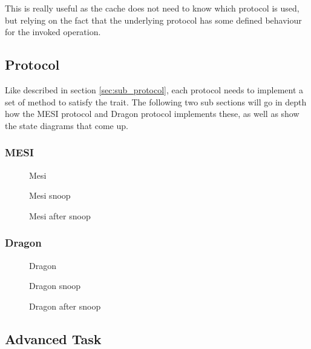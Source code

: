 This is really useful as the cache does not need to know which protocol is used, but relying on the fact that the underlying protocol has some defined behaviour for the invoked operation.


\subsection{Protocol}
Like described in section \ref{sec:sub_protocol}, each protocol needs to implement a set of method to satisfy the trait.
The following two sub sections will go in depth how the MESI protocol and Dragon protocol implements these, as well as show the state diagrams that come up.

\subsubsection{MESI}

\begin{figure}[ht]
    \centering
    \caption{Mesi}
    \label{fig:mesi}
\end{figure}

\begin{figure}[ht]
    \centering
    \caption{Mesi snoop}
    \label{fig:mesi_snoop}
\end{figure}

\begin{figure}[ht]
    \centering
    \caption{Mesi after snoop}
    \label{fig:mesi_after_snoop}
\end{figure}

\subsubsection{Dragon}

\begin{figure}[ht]
    \centering
    \caption{Dragon}
    \label{fig:dragon}
\end{figure}


\begin{figure}[ht]
    \centering
    \caption{Dragon snoop}
    \label{fig:dragon_snoop}
\end{figure}

\begin{figure}[ht]
    \centering
    \caption{Dragon after snoop}
    \label{fig:dragon_after_snoop}
\end{figure}

\subsection{Advanced Task}
